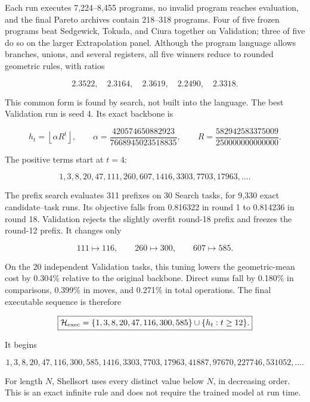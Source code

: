 Each run executes 7,224--8,455 programs, no invalid program reaches evaluation,
and the final Pareto archives contain 218--318 programs.  Four of five frozen programs beat
Sedgewick, Tokuda, and Ciura together on Validation; three of five do so on the
larger Extrapolation panel.  Although the program language allows branches,
unions, and several registers, all five winners reduce to rounded geometric
rules, with ratios

\[
  2.3522,\quad2.3164,\quad2.3619,\quad2.2490,\quad2.3318.
\]

This common form is found by search, not built into the language.  The best
Validation run is seed 4.  Its exact backbone is

\begin{equation}
  h_t=\left\lfloor\alpha R^t\right\rfloor,
  \qquad
  \alpha=\frac{420574650882923}{7668945023518835},
  \qquad
  R=\frac{582942583375009}{250000000000000}.
  \label{eq:geometric-backbone}
\end{equation}

The positive terms start at $t=4$:

\[
  1,3,8,20,47,111,260,607,1416,3303,7703,17963,\ldots.
\]

The prefix search evaluates 311 prefixes on 30 Search tasks, for 9,330 exact
candidate--task runs.  Its objective falls from 0.816322 in round 1 to 0.814236
in round 18.  Validation rejects the slightly overfit round-18 prefix and
freezes the round-12 prefix.  It changes only

\[
  111\mapsto116,\qquad260\mapsto300,\qquad607\mapsto585.
\]

On the 20 independent Validation tasks, this tuning lowers the geometric-mean
cost by 0.304\% relative to the original backbone.  Direct sums fall by
0.180\% in comparisons, 0.399\% in moves, and 0.271\% in total operations.
The final executable sequence is therefore

\begin{equation}
  \boxed{
  \mathcal H_{\rm exec}
  =\{1,3,8,20,47,116,300,585\}
   \cup\{h_t:t\ge12\}.}
  \label{eq:exec-sequence}
\end{equation}

It begins

\[
  1,3,8,20,47,116,300,585,1416,3303,7703,17963,
  41887,97670,227746,531052,\ldots.
\]

For length $N$, Shellsort uses every distinct value below $N$, in decreasing
order.  This is an exact infinite rule and does not require the trained model
at run time.

